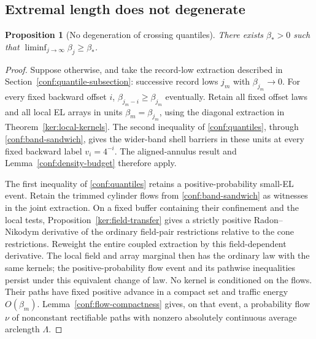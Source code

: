 \documentclass[11pt]{article}
\numberwithin{equation}{section}
\newtheorem{proposition}[theorem]{Proposition}
\theoremstyle{definition}
\theoremstyle{remark}
\newcommand{\1}{\mathbf 1}
\begin{document}
\subsection{Extremal length does not degenerate}
\label{conf:nondegeneration-subsection}

\begin{proposition}[No degeneration of crossing quantiles]
\label{conf:no-degeneration}
There exists \(\beta_*>0\) such that
\(\liminf_{j\to\infty}\beta_j\ge\beta_*\).
\end{proposition}

\begin{proof}
Suppose otherwise, and take the record-low extraction described in
Section~\ref{conf:quantile-subsection}: successive record lows \(j_m\) with
\(\beta_{j_m}\to0\).  For every fixed backward offset \(i\),
\(\beta_{j_m-i}\ge\beta_{j_m}\) eventually.  Retain all fixed
offset laws and all local EL arrays in units
\(\beta_m=\beta_{j_m}\), using the diagonal extraction in
Theorem~\ref{ker:local-kernels}.  The second inequality of
\eqref{conf:quantiles}, through \eqref{conf:band-sandwich}, gives
the wider-band shell barriers in these units at every fixed backward
label \(v_i=4^{-i}\).  The aligned-annulus result and
Lemma~\ref{conf:density-budget} therefore apply.

The first inequality of \eqref{conf:quantiles} retains a
positive-probability small-EL event.  Retain the trimmed cylinder flows
from \eqref{conf:band-sandwich} as witnesses in the joint extraction.
On a fixed buffer containing their confinement and the local tests,
Proposition~\ref{ker:field-transfer} gives a strictly positive
Radon--Nikodym derivative of the ordinary field-pair restrictions
relative to the cone restrictions.  Reweight the entire coupled
extraction by this field-dependent derivative.  The local field and
array marginal then has the ordinary law with the same kernels;
the positive-probability flow event and its pathwise inequalities
persist under this equivalent change of law.  No kernel is conditioned
on the flows.  Their paths have fixed positive advance in a compact
set and traffic energy \(O(\beta_m)\).  Lemma~\ref{conf:flow-compactness}
gives, on that event, a probability flow \(\nu\) of nonconstant
rectifiable paths with nonzero absolutely continuous average arclength
\(\Lambda\).


\end{proof}
\end{document}
